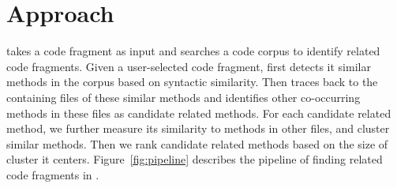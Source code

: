 \section{Approach}
\label{sec:approach}
{\tool} takes a code fragment as input and searches a code corpus to identify related code fragments. Given a user-selected code fragment, {\tool} first detects it similar methods in the corpus based on syntactic similarity. Then {\tool} traces back to the containing files of these similar methods and identifies other co-occurring methods in these files as candidate related methods. For each candidate related method, we further measure its similarity to methods in other files, and cluster similar methods. Then we rank candidate related methods based on the size of cluster it centers. Figure~\ref{fig:pipeline} describes the pipeline of finding related code fragments in {\tool}. 


